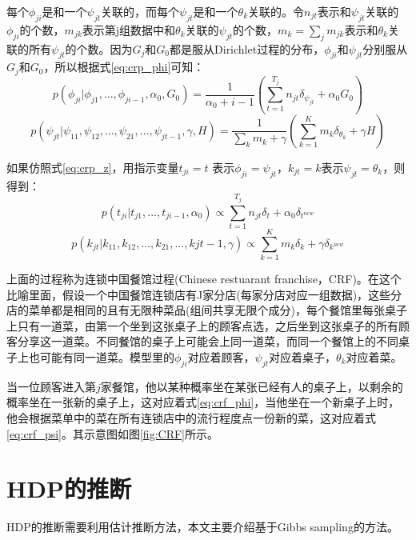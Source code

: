 每个$\phi_{ji}$是和一个$\psi_{jt}$关联的，而每个$\psi_{jt}$是和一个$\theta_k$关联的。令$n_{jt}$表示和$\psi_{jt}$关联的$\phi_{ji}$的个数，$m_{jk}$表示第j组数据中和$\theta_k$关联的$\psi_{jt}$的个数，$m_k = \sum_{j}m_{jk}$表示和$\theta_k$关联的所有$\psi_{jt}$的个数。因为$G_j$和$G_0$都是服从Dirichlet过程的分布，$\phi_{ji}$和$\psi_{jt}$分别服从$G_j$和$G_0$，所以根据式\eqref{eq:crp_phi}可知：
\begin{equation}
p(\phi_{ji}|\phi_{j1},...,\phi_{j {i-1}},\alpha_0,G_0) = \frac{1}{\alpha_0+i-1}(\sum_{t=1}^{T_j}n_{jt}\delta_{\psi_{jt}} +\alpha_0G_0 ) \label{eq:crf_phi}
\end{equation}
\begin{equation}
p(\psi_{jt}|\psi_{11},\psi_{12},...,\psi_{21},...,\psi_{j {t-1}},\gamma,H) = \frac{1}{\sum_k{m_k}+\gamma}(\sum_{k=1}^{K}m_{k}\delta_{\theta_{k}} +\gamma H ) \label{eq:crf_psi}
\end{equation}

如果仿照式\eqref{eq:crp_z}，用指示变量$t_{ji} = t$ 表示$\phi_{ji} = \psi_{jt}$，$k_{jt} = k$表示$\psi_{jt} = \theta_k$，则得到：
\begin{equation}
p(t_{ji}|t_{j1},...,t_{j {i-1}},\alpha_0) \propto \sum_{t=1}^{T_j}n_{jt}\delta_{t} +\alpha_0\delta_{t^{new}}\label{eq:crf_t}
\end{equation}
\begin{equation}
p(k_{jt}|k_{11},k_{12},...,k_{21},...,k{j {t-1}},\gamma) \propto \sum_{k=1}^{K}m_{k}\delta_{k} +\gamma\delta_{k^{new}}  \label{eq:crf_k}
\end{equation}

上面的过程称为连锁中国餐馆过程(Chinese restuarant franchise，CRF)。在这个比喻里面，假设一个中国餐馆连锁店有J家分店(每家分店对应一组数据)，这些分店的菜单都是相同的且有无限种菜品(组间共享无限个成分)，每个餐馆里每张桌子上只有一道菜，由第一个坐到这张桌子上的顾客点选，之后坐到这张桌子的所有顾客分享这一道菜。不同餐馆的桌子上可能会上同一道菜，而同一个餐馆上的不同桌子上也可能有同一道菜。模型里的$\phi_{ji}$对应着顾客，$\psi_{jt}$对应着桌子，$\theta_k$对应着菜。

当一位顾客进入第$j$家餐馆，他以某种概率坐在某张已经有人的桌子上，以剩余的概率坐在一张新的桌子上，这对应着式\eqref{eq:crf_phi}，当他坐在一个新桌子上时，他会根据菜单中的菜在所有连锁店中的流行程度点一份新的菜，这对应着式\eqref{eq:crf_psi}。其示意图如图\ref{fig:CRF}所示。

\section{HDP的推断}
HDP的推断需要利用估计推断方法，本文主要介绍基于Gibbs sampling的方法\cite{NEAL:00,TEH:06}。
